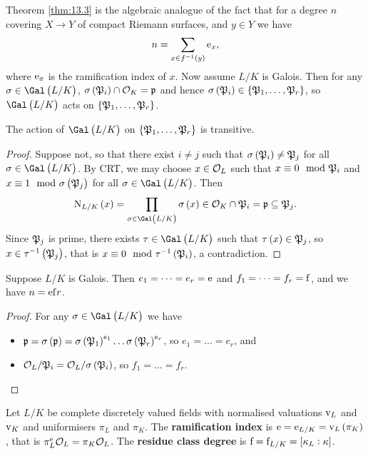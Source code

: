 Theorem \ref{thm:13.3} is the algebraic analogue of the fact that for a degree $ n $ covering $ X \to Y $ of compact Riemann surfaces, and $ y \in Y $ we have
$$ n = \sum_{x \in f^{-1}\br{y}} \e_x, $$
where $ \mathrm{e}_x $ is the ramification index of $ x $. Now assume $ L / K $ is Galois. Then for any $ \sigma \in \Gal\br{L / K} $, $ \sigma\br{\pp_i} \cap \OOO_K = \ppp $ and hence $ \sigma\br{\pp_i} \in \cbr{\pp_1, \dots, \pp_r} $, so $ \Gal\br{L / K} $ acts on $ \cbr{\pp_1, \dots, \pp_r} $.

\begin{proposition}
\label{prop:13.4}
The action of $ \Gal\br{L / K} $ on $ \cbr{\pp_1, \dots, \pp_r} $ is transitive.
\end{proposition}

\begin{proof}
Suppose not, so that there exist $ i \ne j $ such that $ \sigma\br{\pp_i} \ne \pp_j $ for all $ \sigma \in \Gal\br{L / K} $. By CRT, we may choose $ x \in \mathcal{O}_L $ such that $ x \equiv 0 \mod {\mathfrak{P}}_i $ and $ x \equiv 1 \mod \sigma\br{\pp_j} $ for all $ \sigma \in \Gal\br{L / K} $. Then
$$ \N_{L / K}\br{x} = \prod_{\sigma \in \Gal\br{L / K}} \sigma\br{x} \in \OOO_K \cap \pp_i = \ppp \subseteq \pp_j. $$
Since $ \mathfrak{P}_j $ is prime, there exists $ \tau \in \Gal\br{L / K} $ such that $ \tau\br{x} \in \pp_j $, so $ x \in \tau^{-1}\br{\pp_j} $, that is $ x \equiv 0 \mod \tau^{-1}\br{\pp_i} $, a contradiction.
\end{proof}

\pagebreak

\begin{corollary}
Suppose $ L / K $ is Galois. Then $ e_1 = \dots = e_r = \mathrm{e} $ and $ f_1 = \dots = f_r = \mathrm{f} $, and we have $ n = \mathrm{e}\mathrm{f} r $.
\end{corollary}

\begin{proof}
For any $ \sigma \in \Gal\br{L / K} $ we have
\begin{itemize}
\item $ \ppp = \sigma\br{\ppp} = \sigma\br{\pp_1}^{e_1} \dots \sigma\br{\pp_r}^{e_r} $, so $ e_1 = \dots = e_r $, and
\item $ \OOO_L / \pp_i = \OOO_L / \sigma\br{\pp_i} $, so $ f_1 = \dots = f_r $.
\end{itemize}
\end{proof}

Let $ L / K $ be complete discretely valued fields with normalised valuations $ \mathrm{v}_L $ and $ \mathrm{v}_K $ and uniformisers $ \pi_L $ and $ \pi_K $. The \textbf{ramification index} is $ \e = \e_{L / K} = \v_L\br{\pi_K} $, that is $ \pi_L^{\mathrm{e}}\mathcal{O}_L = \pi_K\mathcal{O}_L $. The \textbf{residue class degree} is $ \f = \f_{L / K} = \sbr{\kappa_L : \kappa} $.

